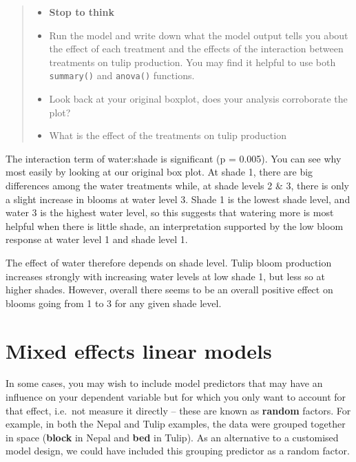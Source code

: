 \documentclass[
]{book}
\providecommand{\tightlist}{%
  \setlength{\itemsep}{0pt}\setlength{\parskip}{0pt}}
\begin{document}
\begin{quote}
\begin{itemize}
\tightlist
\item
  \textbf{Stop to think}
\item
  Run the model and write down what the model output tells you about the effect of each treatment and the effects of the interaction between treatments on tulip production. You may find it helpful to use both \texttt{summary()} and \texttt{anova()} functions.\\
\item
  Look back at your original boxplot, does your analysis corroborate the plot?
\item
  What is the effect of the treatments on tulip production
\end{itemize}
\end{quote}

The interaction term of water:shade is significant (p = 0.005). You can see why most easily by looking at our original box plot. At shade 1, there are big differences among the water treatments while, at shade levels 2 \& 3, there is only a slight increase in blooms at water level 3. Shade 1 is the lowest shade level, and water 3 is the highest water level, so this suggests that watering more is most helpful when there is little shade, an interpretation supported by the low bloom response at water level 1 and shade level 1.

The effect of water therefore depends on shade level. Tulip bloom production increases strongly with increasing water levels at low shade 1, but less so at higher shades. However, overall there seems to be an overall positive effect on blooms going from 1 to 3 for any given shade level.

\section{Mixed effects linear models}\label{mixed-effects-linear-models}

In some cases, you may wish to include model predictors that may have an influence on your dependent variable but for which you only want to account for that effect, i.e.~not measure it directly -- these are known as \textbf{random} factors. For example, in both the Nepal and Tulip examples, the data were grouped together in space (\textbf{block} in Nepal and \textbf{bed} in Tulip). As an alternative to a customised model design, we could have included this grouping predictor as a random factor.
\end{document}

